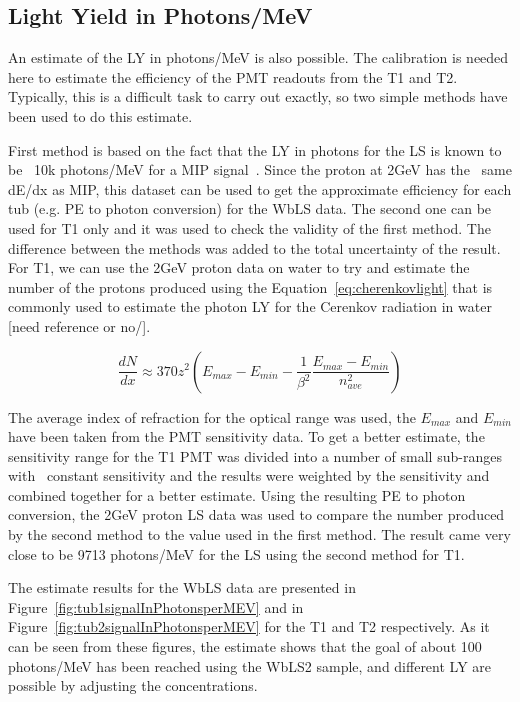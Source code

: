 \documentclass[preprint,12pt]{elsarticle}
\begin{document}
\subsection{Light Yield in Photons/MeV}

An estimate of the LY in photons/MeV is also possible. The calibration is needed here to estimate the efficiency of the PMT readouts from the T1 and T2. Typically, this is a difficult task to carry out exactly, so two simple methods have been used to do this estimate.

First method is based on the fact that the LY in photons for the LS is known to be ~10k photons/MeV for a MIP signal~\cite{LYscintanddirection}. Since the proton at 2GeV has the ~same dE/dx as MIP, this dataset can be used to get the approximate efficiency for each tub (e.g. PE to photon conversion) for the WbLS data. The second one can be used for T1 only and it was used to check the validity of the first method. The difference between the methods was added to the total uncertainty of the result. For T1, we can use the 2GeV proton data on water to try and estimate the number of the protons produced using the Equation~\ref{eq:cherenkovlight} that is commonly used to estimate the photon LY for the Cerenkov radiation in water [need reference or no/].

\begin{equation} \frac{dN}{dx} \approx 370 z^2 (E_{max} - E_{min} - \frac{1}{\beta^2} \frac{E_{max} - E_{min}}{n^2_{ave}}) \label{eq:cherenkovlight} \end{equation}

The average index of refraction for the optical range was used, the $E_{max}$ and $E_{min}$ have been taken from the PMT sensitivity data. To get a better estimate, the sensitivity range for the T1 PMT was divided into a number of small sub-ranges with ~constant sensitivity and the results were weighted by the sensitivity and combined together for a better estimate. Using the resulting PE to photon conversion, the 2GeV proton LS data was used to compare the number produced by the second method to the value used in the first method. The result came very close to be 9713 photons/MeV for the LS using the second method for T1.

The estimate results for the WbLS data are presented in Figure~\ref{fig:tub1signalInPhotonsperMEV} and in Figure~\ref{fig:tub2signalInPhotonsperMEV} for the T1 and T2 respectively. As it can be seen from these figures, the estimate shows that the goal of about 100 photons/MeV has been reached using the WbLS2 sample, and different LY are possible by adjusting the concentrations.
\end{document}
